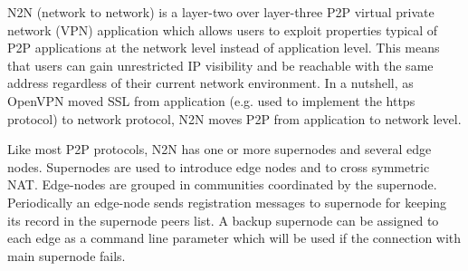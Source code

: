 \onehalfspacing
N2N (network to network)\cite{n2n_paper} is a layer-two over layer-three P2P virtual private network (VPN) application which allows users to exploit properties typical of P2P applications at the network level instead of application level. This means that users can gain unrestricted IP visibility and be reachable with the same address regardless of their current network environment. In a nutshell, as OpenVPN moved SSL \cite{tls} from application (e.g. used to implement the https protocol) to network protocol, N2N moves P2P from application to network level.

Like most P2P protocols, N2N has one or more supernodes and several edge nodes. Supernodes are used to introduce edge nodes and to cross symmetric NAT. Edge-nodes are grouped in communities coordinated by the supernode. Periodically an edge-node sends registration messages to supernode for keeping its record in the supernode peers list. A backup supernode can be assigned to each edge as a command line parameter which will be used if the connection with main supernode fails.

